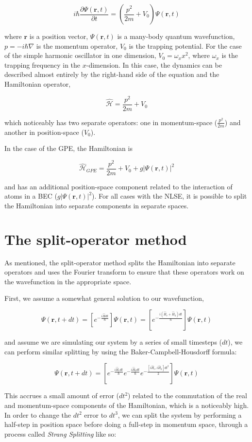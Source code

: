 $$
i\hbar\frac{\partial\Psi(\mathbf{r},t)}{\partial t} = \left(\frac{p^2}{2m} + V_0\right) \Psi(\mathbf{r},t)
$$

where $\mathbf{r}$ is a position vector, $\Psi(\mathbf{r},t)$ is a many-body quantum wavefunction, $p = -i\hbar\nabla$ is the momentum operator, $V_0$ is the trapping potential.
For the case of the simple harmonic oscillator in one dimension, $V_0 = \omega_x x^2$, where $\omega_x$ is the trapping frequency in the $x$-dimension.
In this case, the dynamics can be described almost entirely by the right-hand side of the equation and the Hamiltonian operator,

$$
\mathcal{\hat H} = \frac{p^2}{2m} + V_0
$$

which noticeably has two separate operators: one in momentum-space ($\frac{p^2}{2m}$) and another in position-space ($V_0$).

In the case of the GPE, the Hamiltonian is

$$
\mathcal{\hat H}_{GPE} = \frac{p^2}{2m} + V_0 + g|\Psi(\mathbf{r},t)|^2
$$

and has an additional position-space component related to the interaction of atoms in a BEC ($g|\Psi(\mathbf{r},t)|^2$).
For all cases with the NLSE, it is possible to split the Hamiltonian into separate components in separate spaces.

\section{The split-operator method}

As mentioned, the split-operator method splits the Hamiltonian into separate operators and uses the Fourier transform to ensure that these operators work on the wavefunction in the appropriate space.

First, we assume a somewhat general solution to our wavefunction,

$$
\Psi(\mathbf{r},t + dt) = \left[e^{-\frac{i\hat{H}dt}{\hbar}}\right]\Psi(\mathbf{r},t) = \left[e^{-\frac{i(\hat{H}_r + \hat{H}_k)dt}{\hbar}}\right]\Psi(\mathbf{r},t)
$$

and assume we are simulating our system by a series of small timesteps ($dt$), we can perform similar splitting by using the Baker-Campbell-Housdorff formula:

$$
\Psi(\mathbf{r},t+dt) = \left[e^{-\frac{i\hat{H}_rdt}{\hbar}}e^{-\frac{i\hat{H}_kdt}{\hbar}}e^{-\frac{[i\hat{H}_r, i\hat{H}_k]dt^2}{2}}\right]\Psi(\mathbf{r},t)
$$

This accrues a small amount of error ($dt^2$) related to the commutation of the real and momentum-space components of the Hamiltonian, which is a noticeably high.
In order to change the $dt^2$ error to $dt^3$, we can split the system by performing a half-step in position space before doing a full-step in momentum space, through a process called \textit{Strang Splitting} like so:

